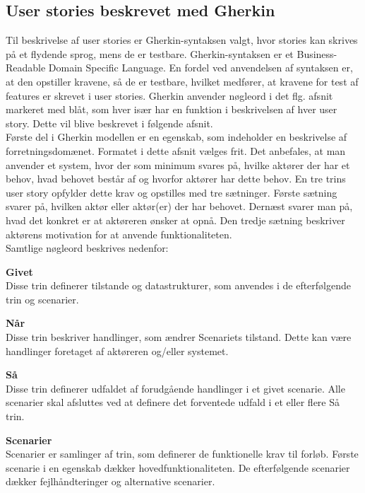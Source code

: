 \subsection{User stories beskrevet med Gherkin}
Til beskrivelse af user stories er Gherkin-syntaksen\cite{Gherkin} valgt, hvor stories 
kan skrives på et flydende sprog, mens de er testbare. Gherkin-syntaksen er et Business-Readable Domain  
Specific Language. En fordel ved anvendelsen af syntaksen er, at den opstiller kravene, så de er testbare, hvilket medfører, at kravene for test af features er skrevet i user stories.
Gherkin anvender nøgleord i det flg. afsnit 
markeret med blåt,  som hver især har en funktion i beskrivelsen af hver 
user story. Dette vil blive beskrevet i følgende afsnit.  \vspace{0.2 cm}\\
Første del i Gherkin modellen er en egenskab, som indeholder en beskrivelse af forretningsdomænet. 
Formatet i	dette afsnit vælges frit. Det anbefales, at man anvender et 
system, hvor der som minimum svares på, hvilke aktører der har et behov, hvad 
behovet består af og hvorfor aktører har dette behov. En tre trins user 
story opfylder dette krav og opstilles med tre 
sætninger. Første sætning svarer på, hvilken aktør eller aktør(er) der har
behovet. Dernæst svarer man på, hvad det konkret er at aktøreren ønsker at 
opnå. Den tredje sætning beskriver aktørens motivation for at anvende 
funktionaliteten. \\
Samtlige nøgleord beskrives nedenfor:

\large{\textbf{Givet}}\\
Disse trin definerer tilstande og datastrukturer, som anvendes i de 
efterfølgende trin og scenarier.

\large{\textbf{Når}}\\
Disse trin beskriver handlinger, som ændrer Scenariets tilstand. Dette kan 
være handlinger	foretaget af aktøreren og/eller systemet.

\large{\textbf{Så}}\\
Disse trin definerer udfaldet af forudgående handlinger i et givet 
scenarie. Alle scenarier skal afsluttes ved at definere det forventede 
udfald i et eller flere Så trin.

\large{\textbf{Scenarier}}\\
Scenarier er samlinger af trin, som definerer de funktionelle krav til 
forløb. Første scenarie i en egenskab dækker hovedfunktionaliteten. De 
efterfølgende scenarier dækker fejlhåndteringer og alternative scenarier.

